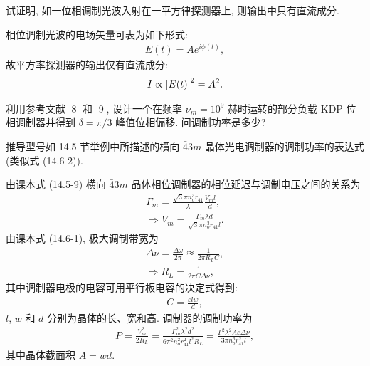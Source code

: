 \documentclass{note}
\begin{document}
\begin{exe}
    试证明, 如一位相调制光波入射在一平方律探测器上, 则输出中只有直流成分.
\end{exe}
\begin{pf}
    相位调制光波的电场矢量可表为如下形式:
    \begin{align}
        E(t)=Ae^{i\phi(t)},
    \end{align}
    故平方率探测器的输出仅有直流成分:
    \begin{align}
        I\propto\left\lvert E(t)\right\rvert^2=A^2.
    \end{align}
\end{pf}

\begin{exe}
    利用参考文献 [8] 和 [9], 设计一个在频率 $\nu_m=10^9$ 赫时运转的部分负载 KDP 位相调制器并得到 $\delta=\pi/3$ 峰值位相偏移. 问调制功率是多少?
\end{exe}
\begin{sol}
    
\end{sol}

\begin{exe}
    推导型号如 14.5 节举例中所描述的横向 $\bar{4}3m$ 晶体光电调制器的调制功率的表达式 (类似式 (14.6-2)).
\end{exe}
\begin{pf}
    由课本式 (14.5-9) 横向 $\bar{4}3m$ 晶体相位调制器的相位延迟与调制电压之间的关系为
    \begin{gather}
        \Gamma_m=\frac{\sqrt{3}\pi n_o^3r_{41}}{\lambda}\frac{V_ml}{d},\\
        \Longrightarrow V_m=\frac{\Gamma_m\lambda d}{\sqrt{3}\pi n_o^3r_{41}l}.
    \end{gather}
    由课本式 (14.6-1), 极大调制带宽为
    \begin{gather}
        \Delta\nu=\frac{\Delta\omega}{2\pi}\approxeq\frac{1}{2\pi R_LC},\\
        \Longrightarrow R_L=\frac{1}{2\pi C\Delta\nu},
    \end{gather}
    其中调制器电极的电容可用平行板电容的决定式得到:
    \begin{align}
        C=\frac{\varepsilon lw}{d},
    \end{align}
    $l$, $w$ 和 $d$ 分别为晶体的长、宽和高.
    调制器的调制功率为
    \begin{align}
        P=\frac{V_m^2}{2R_L}=\frac{\Gamma_m^2\lambda^2d^2}{6\pi^2n_o^2r_{41}^2l^2R_L}=\frac{\Gamma^2\lambda^2A\varepsilon\Delta\nu}{3\pi n_o^6r_{41}^2l},
    \end{align}
    其中晶体截面积 $A=wd$.
\end{pf}
\end{document}
